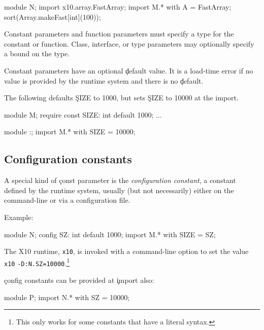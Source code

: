 \documentclass{article}
\newcommand\Xten{{\sf X10}\xspace}
\begin{document}
\begin{xten}
module N;
import x10.array.FastArray;
import M.* with A = FastArray;
sort(Array.makeFast[int](100));
\end{xten}

Constant parameters and function parameters must specify a type
for the constant or function.  Class, interface, or type parameters may
optionally specify a bound on the type.

Constant parameters have an optional \c{default} value.
It is a load-time error if no value is provided by the runtime
system and there is no \c{default}.

The following defaults \c{SIZE} to 1000, but sets \c{SIZE} to 10000
at the import.
\begin{xten}
module M;
require const SIZE: int default 1000;
... 

module :;
import M.* with SIZE = 10000;
\end{xten}

\subsection{Configuration constants}
\label{sec:config}

A special kind of \c{const} parameter is the \emph{configuration constant},
a constant defined by the runtime system, usually (but not
necessarily) either on the
command-line or via a configuration file.

Example:
\begin{xten}
module N;
config SZ: int default 1000;
import M.* with SIZE = SZ;
\end{xten}

The \Xten runtime, \texttt{x10}, is invoked with a
command-line option to set the value
\texttt{x10} \texttt{-D:N.SZ=10000}.\footnote{This only
works for some constants that have a literal syntax.}

\c{config} constants can be provided at \c{import} also:
\begin{xten}
module P;
import N.* with SZ = 10000;
\end{xten}
\end{document}
